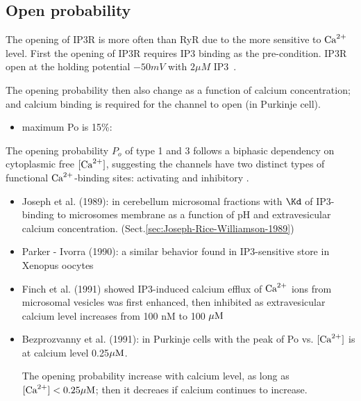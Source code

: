 


\subsection{Open probability}
\label{sec:IP3R-open-probability}
\label{sec:IP3R-biphasic-behavior}

The opening of IP3R is more often than RyR due to the more sensitive to ${\text{Ca}^{2+}}$
level. First the opening of IP3R requires IP3 binding as the pre-condition.
IP3R open at the holding potential $-50mV$ with $2\mu M$
IP3~\cite{watras1991ip3r}. 

The opening probability then also change as a function of calcium
concentration; and calcium binding is required for the channel to open (in
Purkinje cell).
\begin{itemize}
  \item maximum Po is 15\%: \citep{bezprozvanny1991ip3r}
\end{itemize}

The opening probability $P_o$ of type 1 and 3 follows a biphasic dependency on
cytoplasmic free $[{\text{Ca}^{2+}}]$, suggesting the channels have two distinct types of
functional ${\text{Ca}^{2+}}$-binding sites: activating and inhibitory
\citep{mak1998,mak2001}.
\begin{itemize}
  \item Joseph et al. (1989): in cerebellum microsomal fractions with $\Kd$ of
  IP3-binding to microsomes membrane as a function of pH and extravesicular
  calcium concentration. (Sect.\ref{sec:Joseph-Rice-Williamson-1989})

  \item Parker - Ivorra (1990): a similar behavior found in IP3-sensitive store
  in Xenopus oocytes

  \item Finch et al. (1991) showed IP3-induced calcium efflux of ${\text{Ca}^{2+}}$ ions from
  microsomal vesicles was first enhanced, then inhibited as extravesicular
  calcium level increases from 100 nM to 100 ${\mu\text{M}}$
  
  \item Bezprozvanny et al. (1991): in Purkinje cells with the peak of Po vs.
  $[{\text{Ca}^{2+}}]$ is at calcium level 0.25${\mu\text{M}}$.

The opening probability increase with calcium level, as long as $[{\text{Ca}^{2+}}] <
0.25{\mu\text{M}}$; then it decreaes if calcium continues to increase.
  
\end{itemize}


